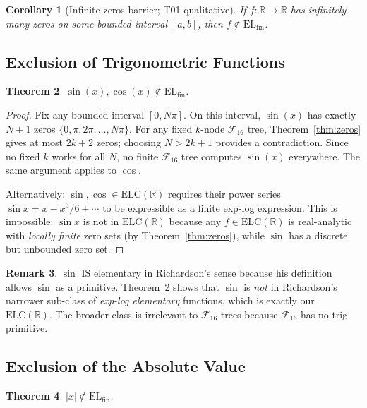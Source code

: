 \documentclass[12pt,a4paper]{article}
\newtheorem{theorem}{Theorem}[section]
\newtheorem{corollary}[theorem]{Corollary}
\theoremstyle{definition}
\newtheorem{remark}[theorem]{Remark}
\newcommand{\F}{\mathcal{F}_{16}}
\newcommand{\ELfin}{\mathrm{EL}_{\mathrm{fin}}}
\newcommand{\ELC}{\mathrm{ELC}(\mathbb{R})}
\newcommand{\R}{\mathbb{R}}
\begin{document}
\begin{corollary}[Infinite zeros barrier; T01-qualitative]
\label{cor:t01}
If $f:\R\to\R$ has infinitely many zeros on some bounded interval $[a,b]$,
then $f\notin\ELfin$.
\end{corollary}

\subsection{Exclusion of Trigonometric Functions}

\begin{theorem}
\label{thm:notrig}
$\sin(x),\cos(x)\notin\ELfin$.
\end{theorem}

\begin{proof}
Fix any bounded interval $[0,N\pi]$.  On this interval, $\sin(x)$ has exactly
$N+1$ zeros $\{0,\pi,2\pi,\ldots,N\pi\}$.  For any fixed $k$-node $\F$ tree,
Theorem~\ref{thm:zeros} gives at most $2k+2$ zeros; choosing $N > 2k+1$
provides a contradiction.  Since no fixed $k$ works for all $N$, no finite
$\F$ tree computes $\sin(x)$ everywhere.  The same argument applies to $\cos$.

Alternatively: $\sin,\cos\in\ELC$ requires their power series
$\sin x = x - x^3/6 + \cdots$ to be expressible as a finite exp-log expression.
This is impossible: $\sin x$ is not in $\ELC$ because any $f\in\ELC$ is
real-analytic with \emph{locally finite} zero sets (by Theorem~\ref{thm:zeros}),
while $\sin$ has a discrete but unbounded zero set.
\end{proof}

\begin{remark}
$\sin$ IS elementary in Richardson's sense \cite{Richardson1968} because his
definition allows $\sin$ as a primitive.  Theorem~\ref{thm:notrig} shows that
$\sin$ is \emph{not} in Richardson's narrower sub-class of \emph{exp-log
elementary} functions, which is exactly our $\ELC$.  The broader class is
irrelevant to $\F$ trees because $\F$ has no trig primitive.
\end{remark}

\subsection{Exclusion of the Absolute Value}

\begin{theorem}
\label{thm:abs}
$|x|\notin\ELfin$.
\end{theorem}
\end{document}
